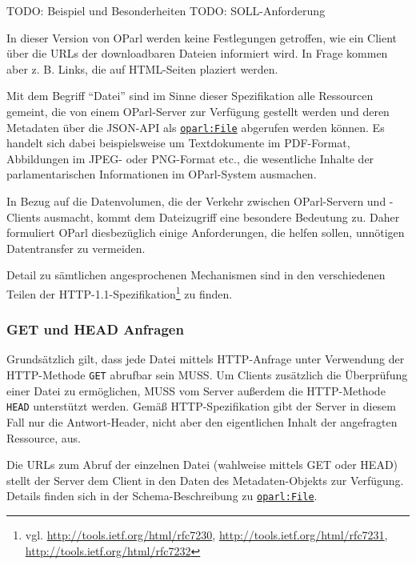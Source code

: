 \documentclass[,a4paper]{article}
\begin{document}
TODO: Beispiel und Besonderheiten TODO: SOLL-Anforderung

In dieser Version von OParl werden keine Festlegungen getroffen, wie ein
Client über die URLs der downloadbaren Dateien informiert wird. In Frage
kommen aber z. B. Links, die auf HTML-Seiten plaziert werden.


Mit dem Begriff ``Datei'' sind im Sinne dieser Spezifikation alle
Ressourcen gemeint, die von einem OParl-Server zur Verfügung gestellt
werden und deren Metadaten über die JSON-API als
\hyperref[oparlux5fdocument]{\texttt{oparl:File}} abgerufen werden
können. Es handelt sich dabei beispielsweise um Textdokumente im
PDF-Format, Abbildungen im JPEG- oder PNG-Format etc., die wesentliche
Inhalte der parlamentarischen Informationen im OParl-System ausmachen.

In Bezug auf die Datenvolumen, die der Verkehr zwischen OParl-Servern
und -Clients ausmacht, kommt dem Dateizugriff eine besondere Bedeutung
zu. Daher formuliert OParl diesbezüglich einige Anforderungen, die
helfen sollen, unnötigen Datentransfer zu vermeiden.

Detail zu sämtlichen angesprochenen Mechanismen sind in den
verschiedenen Teilen der HTTP-1.1-Spezifikation\footnote{vgl.
  \url{http://tools.ietf.org/html/rfc7230},
  \url{http://tools.ietf.org/html/rfc7231},
  \url{http://tools.ietf.org/html/rfc7232}} zu finden.

\subsubsection{GET und HEAD Anfragen}\label{get-und-head-anfragen}

Grundsätzlich gilt, dass jede Datei mittels HTTP-Anfrage unter
Verwendung der HTTP-Methode \texttt{GET} abrufbar sein MUSS. Um Clients
zusätzlich die Überprüfung einer Datei zu ermöglichen, MUSS vom Server
außerdem die HTTP-Methode \texttt{HEAD} unterstützt werden. Gemäß
HTTP-Spezifikation gibt der Server in diesem Fall nur die
Antwort-Header, nicht aber den eigentlichen Inhalt der angefragten
Ressource, aus.

Die URLs zum Abruf der einzelnen Datei (wahlweise mittels GET oder HEAD)
stellt der Server dem Client in den Daten des Metadaten-Objekts zur
Verfügung. Details finden sich in der Schema-Beschreibung zu
\hyperref[oparlux5fdocument]{\texttt{oparl:File}}.
\end{document}

